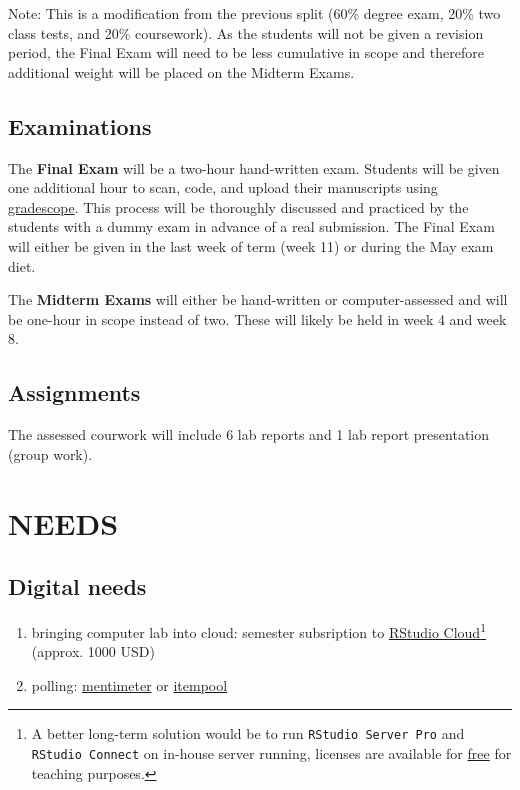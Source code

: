 \documentclass[
]{book}
\providecommand{\tightlist}{%
  \setlength{\itemsep}{0pt}\setlength{\parskip}{0pt}}
\begin{document}
Note: This is a modification from the previous split (60\% degree exam, 20\% two
class tests, and 20\% coursework). As the students will not be given a revision period, the Final Exam will need to be less cumulative in scope and therefore additional weight will be placed on the Midterm Exams.

\hypertarget{examinations}{%
\section*{Examinations}\label{examinations}}

The \textbf{Final Exam} will be a two-hour hand-written exam. Students will be given one additional hour to scan, code, and upload their manuscripts using \href{https://www.gradescope.com/}{gradescope}. This process will be thoroughly discussed and practiced by the students with a dummy exam in advance of a real submission. The Final Exam will either be given in the last week of term (week 11) or during the May exam diet.

The \textbf{Midterm Exams} will either be hand-written or computer-assessed and will be one-hour in scope instead of two. These will likely be held in week 4 and week 8.

\hypertarget{assignments}{%
\section*{Assignments}\label{assignments}}

The assessed courwork will include 6 lab reports and 1 lab report presentation (group work).

\hypertarget{needs}{%
\chapter{NEEDS}\label{needs}}

\hypertarget{digital-needs}{%
\section*{Digital needs}\label{digital-needs}}

\begin{enumerate}
\def\labelenumi{\arabic{enumi}.}
\tightlist
\item
  bringing computer lab into cloud: semester subsription to \href{https://rstudio.cloud/}{RStudio Cloud}\footnote{A better long-term solution would be to run \texttt{RStudio\ Server\ Pro} and \texttt{RStudio\ Connect} on in-house server running, licenses are available for \href{https://rstudio.com/pricing/academic-pricing/}{free} for teaching purposes.} (approx. 1000 USD)
\item
  polling: \href{https://www.mentimeter.com/}{mentimeter} or \href{https://itempool.com/}{itempool}
\end{enumerate}
\end{document}

